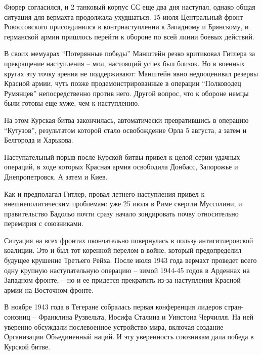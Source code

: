 Фюрер согласился, и 2 танковый корпус СС еще два дня наступал, однако общая
ситуация для вермахта продолжала ухудшаться. 15 июля Центральный фронт
Рокоссовского присоединился в контрнаступлении к Западному и Брянскому, и
германской армии пришлось перейти к обороне по всей линии боевых действий.

В своих мемуарах \enquote{Потерянные победы} Манштейн резко критиковал Гитлера за
прекращение наступления – мол, настоящий успех был близок. Но в военных кругах
эту точку зрения не поддерживают: Манштейн явно недооценивал резервы Красной
армии, чуть позже продемонстрированные в операции \enquote{Полководец Румянцев}
непосредственно против него. Другой вопрос, что к обороне немцы были готовы еще
хуже, чем к наступлению.


На этом Курская битва закончилась, автоматически превратившись в операцию
\enquote{Кутузов}, результатом которой стало освобождение Орла 5 августа, а затем и
Белгорода и Харькова.


Наступательный порыв после Курской битвы привел к целой серии удачных операций,
в ходе которых Красная армия освободила Донбасс, Запорожье и Днепропетровск. А
затем и Киев.

Как и предполагал Гитлер, провал летнего наступления привел к
внешнеполитическим проблемам: уже 25 июля в Риме свергли Муссолини, и
правительство Бадольо почти сразу начало зондировать почву относительно
перемирия с союзниками.

Ситуация на всех фронтах окончательно повернулась в пользу антигитлеровской
коалиции. Это и был тот коренной перелом в войне, который предопределил будущее
крушение Третьего Рейха. После июля 1943 года вермахт проведет всего одну
крупную наступательную операцию – зимой 1944-45 годов в Арденнах на Западном
фронте, – но и ее придется прекратить из-за наступления Красной армии на
Восточном фронте.

В ноябре 1943 года в Тегеране собралась первая конференция лидеров
стран-союзниц – Франклина Рузвельта, Иосифа Сталина и Уинстона Черчилля. На ней
уверенно обсуждали послевоенное устройство мира, включая создание Организации
Объединенный наций. И эту уверенность союзникам дала победа в Курской битве.
